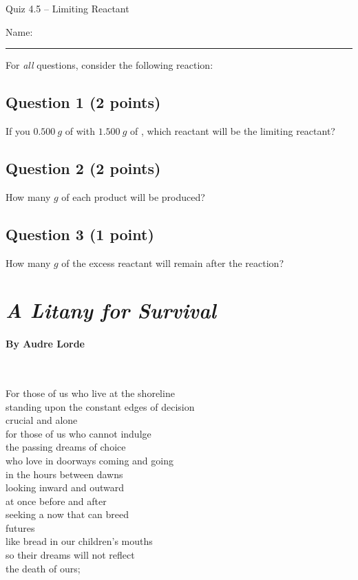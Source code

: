 \documentclass[11pt, letterpaper]{memoir}
\begin{document}
	\begin{center}
		{\large	Quiz 4.5 -- Limiting Reactant}
	\end{center}
{\large Name: \rule[-1mm]{4in}{.1pt}
	
	\noindent
	For \emph{all} questions, consider the following reaction: 
	
	\subsection*{Question 1 (2 points)}
	If you $0.500~g$ of  with $1.500~g$ of , which reactant will be the limiting reactant?
	
	\vspace{13em}
	\subsection*{Question 2 (2 points)}
	How many $g$ of each product will be produced?
	
	\vspace{13em}
	\subsection*{Question 3 (1 point)} 
	How many $g$ of the excess reactant will remain after the reaction?
\newpage
\pagestyle{empty}
\addtocounter{page}{-1}
\section*{\emph{A Litany for Survival}}
\paragraph{By Audre Lorde}~

\vspace{1em}\noindent
\begin{minipage}[t]{0.56\linewidth}
	For those of us who live at the shoreline\\
	standing upon the constant edges of decision\\
	crucial and alone\\
	for those of us who cannot indulge\\
	the passing dreams of choice\\
	who love in doorways coming and going\\
	in the hours between dawns\\
	looking inward and outward\\
	at once before and after\\
	seeking a now that can breed\\
	futures\\
	like bread in our children’s mouths\\
	so their dreams will not reflect\\
	the death of ours;


\end{minipage}}
\end{document}
